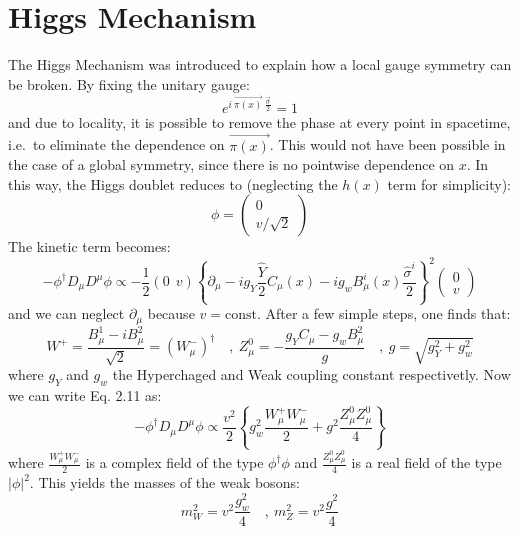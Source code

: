 \documentclass[11pt,a4paper,twoside,openright]{report}
\begin{document}
\section{Higgs Mechanism}
The Higgs Mechanism was introduced to explain how a local gauge symmetry can be broken. By fixing the unitary gauge:
\begin{equation}
e^{i\ \overrightarrow{\pi (x)}\ \frac{\overrightarrow{\sigma}}{2}} =1
\end{equation}
and due to locality, it is possible to remove the phase at every point in spacetime, i.e.\ to eliminate the dependence on \(\overrightarrow{\pi(x)}\). This would not have been possible in the case of a global symmetry, since there is no pointwise dependence on \(x\). In this way, the Higgs doublet reduces to (neglecting the \(h(x)\) term for simplicity):
\begin{equation}
\phi = \begin{pmatrix} 0 \\ v/\sqrt{2} \end{pmatrix}
\end{equation}
The kinetic term becomes:
\begin{equation}
-\phi^\dagger D_\mu D^\mu \phi \propto -\frac{1}{2} (0\ \ v) \left\{ \partial_\mu - ig_Y\frac{\hat{Y}}{2}C_\mu(x)-ig_wB^i_\mu(x)\frac{\hat{\sigma}^i}{2} \right\}^2 \begin{pmatrix} 0 \\ v \end{pmatrix}
\end{equation}
and we can neglect \(\partial_\mu\) because \(v=\mathrm{const}\). After a few simple steps, one finds that:
\begin{equation}
W^+=\frac{B^1_\mu-iB^2_\mu}{\sqrt{2}}=\left( W^-_\mu \right)^\dagger \quad, \ Z^0_\mu=- \frac{g_YC_\mu-g_wB^2_\mu}{g} \quad, \ g=\sqrt{g_Y^2+g_w^2}
\end{equation}
where $g_{Y}$ and $g_w$ the Hyperchaged and Weak coupling constant respectivetly. Now we can write Eq. 2.11 as:
\begin{equation}
-\phi^\dagger D_\mu D^\mu \phi \propto\frac{v^2}{2} \left\{ g_w^2 \frac{W_\mu^+W_\mu^-}{2} + g^2\frac{Z^0_\mu Z^0_\mu}{4} \right\}
\end{equation}
where \(\frac{W_\mu^+W_\mu^-}{2}\) is a complex field of the type \(\phi^\dagger \phi\) and \(\frac{Z^0_\mu Z^0_\mu}{4}\) is a real field of the type \(|\phi|^2\). This yields the masses of the weak bosons:
\begin{equation}
m_W^2=v^2\frac{g_w^2}{4} \quad, \ m_Z^2=v^2\frac{g^2}{4}
\end{equation} 
\end{document}
